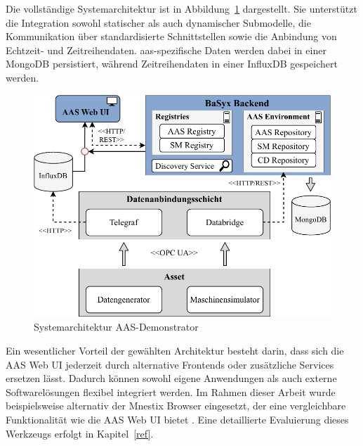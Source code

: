 Die vollständige Systemarchitektur ist in Abbildung~\ref{fig:Systemarchitektur} dargestellt.
Sie unterstützt die Integration sowohl statischer als auch dynamischer Submodelle, die Kommunikation über standardisierte Schnittstellen sowie die Anbindung von Echtzeit- und Zeitreihendaten.
\acs{aas}-spezifische Daten werden dabei in einer MongoDB persistiert, während Zeitreihendaten in einer InfluxDB gespeichert werden.

\begin{figure}[htbp]
    \centering
        \includegraphics[width=1\textwidth]{Bilder/Ergebnisse/DynamischeDaten/Architektur.pdf}
    \caption{Systemarchitektur AAS-Demonstrator}
    \label{fig:Systemarchitektur}
\end{figure}


Ein wesentlicher Vorteil der gewählten Architektur besteht darin, dass sich die AAS Web UI jederzeit durch alternative Frontends oder zusätzliche Services ersetzen lässt.
Dadurch können sowohl eigene Anwendungen als auch externe Softwarelösungen flexibel integriert werden.
Im Rahmen dieser Arbeit wurde beispielsweise alternativ der Mnestix Browser eingesetzt, der eine vergleichbare Funktionalität wie die AAS Web UI bietet \cite{Quelle}.
Eine detaillierte Evaluierung dieses Werkzeugs erfolgt in Kapitel~\ref{ref}.

